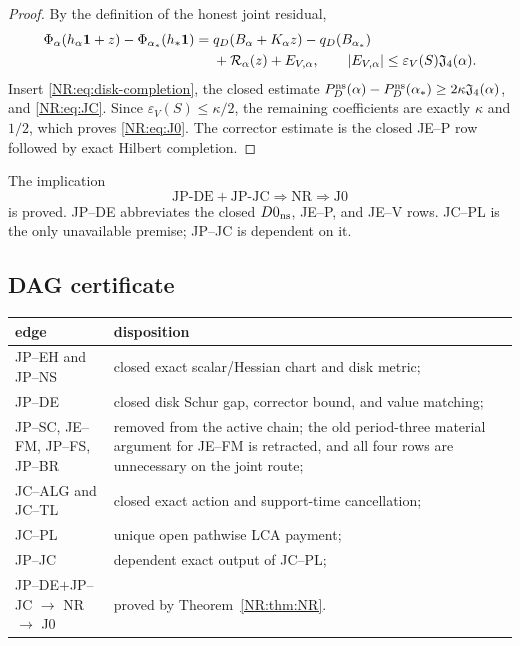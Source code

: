 \begin{proof}
By the definition of the honest joint residual,
\begin{align*}
 \Phi_\alpha(h_\alpha\mathbf1+z)
 -\Phi_{\alpha_*}(h_*\mathbf1)
 ={}&q_D(B_\alpha+K_\alpha z)-q_D(B_{\alpha_*})\\
 &+\mathcal{R}_\alpha(z)+E_{V,\alpha},
 \qquad |E_{V,\alpha}|\le\varepsilon_V(S)\mathfrak J_4(\alpha).
\end{align*}
Insert \eqref{NR:eq:disk-completion}, the closed estimate
$P_D^{\rm ns}(\alpha)-P_D^{\rm ns}(\alpha_*)
\ge2\kappa\mathfrak J_4(\alpha)$, and \eqref{NR:eq:JC}.  Since
$\varepsilon_V(S)\le\kappa/2$, the remaining coefficients are exactly
$\kappa$ and $1/2$, which proves \eqref{NR:eq:J0}.  The corrector estimate is
the closed JE--P row followed by exact Hilbert completion.
\end{proof}

\begin{corollary}\label{NR:cor:J0}
The implication
\[
 \boxed{\mathrm{JP\text{-}DE+JP\text{-}JC}
 \Longrightarrow\mathrm{NR}\Longrightarrow\mathrm{J0}}
\]
is proved.  JP--DE abbreviates the closed $D0_{\rm ns}$, JE--P, and JE--V
rows.  JC--PL is the only unavailable premise; JP--JC is dependent on it.
\end{corollary}

\subsection{DAG certificate}

\begin{center}
\begin{longtable}{>{\raggedright\arraybackslash}p{.34\linewidth}
                  >{\raggedright\arraybackslash}p{.54\linewidth}}
\toprule
edge & disposition\\
\midrule
JP--EH and JP--NS & closed exact scalar/Hessian chart and disk metric;\\
JP--DE & closed disk Schur gap, corrector bound, and value matching;\\
JP--SC, JE--FM, JP--FS, JP--BR & removed from the active chain; the old
period-three material argument for JE--FM is retracted, and all four rows
are unnecessary on the joint route;\\
JC--ALG and JC--TL & closed exact action and support-time cancellation;\\
JC--PL & unique open pathwise LCA payment;\\
JP--JC & dependent exact output of JC--PL;\\
JP--DE$+$JP--JC $\to$ NR $\to$ J0 & proved by
Theorem~\ref{NR:thm:NR}.\\
\bottomrule
\end{longtable}
\end{center}
\endgroup
